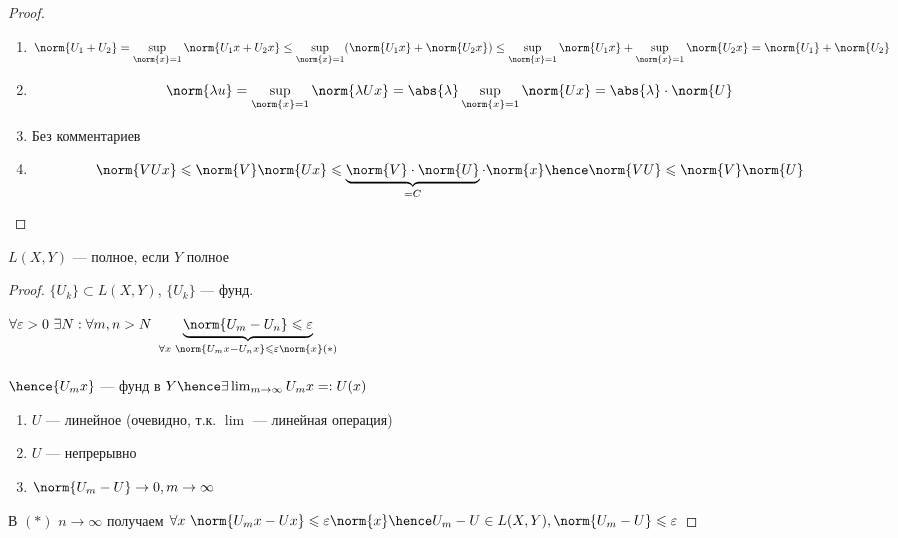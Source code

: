 \begin{proof}
   \begin{enumerate}
       \item 
       \[
           \norm{U_1 + U_2} = \sup_{\norm{x} = 1}\norm{U_1x + U_2x} \le
           \sup_{\norm{x}=1}(\norm{U_1 x} + \norm{U_2 x}) \le
           \sup_{\norm{x}=1}\norm{U_1 x} + \sup_{\norm{x} = 1}\norm{U_2 x} = \norm{U_1} + \norm{U_2}
       \]
       \item \[
           \norm{\lambda u} = \sup_{\norm{x} = 1} {\norm{\lambda Ux}} = \abs{\lambda} \sup_{\norm{x} = 1}{\norm{Ux}} = \abs{\lambda} \cdot \norm{U}
       \]

       \item Без комментариев
       
       \item \[
           \norm{VUx} \leqslant \norm{V} \norm{Ux} \leqslant \underbrace{\norm{V} \cdot \norm{U} }_{ = C}  \cdot \norm{x} \hence \norm{VU} \leqslant \norm{V} \norm{U}
       \]
   \end{enumerate} 
        

\end{proof}



\begin{theorem}
    $L(X, Y)$ --- полное, если $Y$ полное
\end{theorem}


\begin{proof}
    $
        \{ U_k \} \subset L(X, Y)
    $, $\{ U_k \}$ --- фунд.

    $\forall \varepsilon > 0\,\, \exists N : \forall m, n > N \,\, \underbrace{\norm{U_m - U_n} \leqslant \varepsilon}_{\forall x  \,\, \norm{U_mx - U_nx } \leqslant \varepsilon \norm{x}(*)}$ 
\\\\
    $\hence {U_mx} $ --- фунд в $Y \hence \exists \lim_{m \to \infty} U_mx =: U(x)$ 

    \begin{enumerate}
        \item $U$ --- линейное (очевидно, т.к. $\lim$ --- линейная операция)
        \item $U$ --- непрерывно
        \item $\norm{U_m - U} \to 0, m \to \infty$
    \end{enumerate}

    В $(*)$ $n \to \infty$ получаем $\forall x  \, \, \norm{U_mx - Ux} \leqslant \varepsilon \norm{x} \hence U_m - U \in L(X,Y), \norm{U_m - U} \leqslant \varepsilon$


\end{proof}


